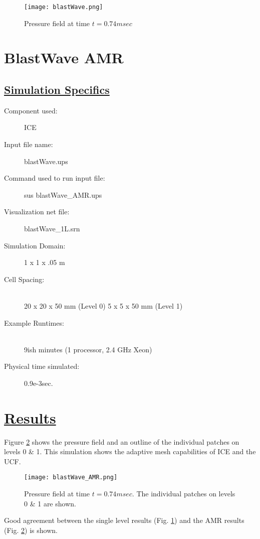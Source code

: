 \begin{figure}
  \texttt{[image: blastWave.png]}
  \caption{Pressure field at time $t = 0.74msec$}
  \label{results.BW}
  \end{figure}
\newpage


\section*{\center BlastWave AMR}
\subsection*{\underline{Simulation Specifics}}
\begin{description} 
\item [Component used:] \hfill ICE
\item [Input file name:] \hfill blastWave.ups
\item [Command used to run input file:]\hfill sus blastWave\_AMR.ups
\item [Visualization net file:]\hfill blastWave\_1L.srn\\


\item [Simulation Domain:]\hfill    1 x 1 x .05 m
\item [Cell Spacing:]\hfill \\ 
20 x 20 x 50 mm (Level 0) 
5 x 5 x 50 mm (Level 1)


\item [Example Runtimes:] \hfill \\
 9ish minutes   (1 processor, 2.4 GHz Xeon)

\item [Physical time simulated:] \hfill 0.9e-3sec.

\end{description}

\section*{\underline{Results}}
Figure \ref{results.BW.AMR} shows the pressure field and an outline of the
individual patches on levels 0 \& 1.  This simulation shows the adaptive
mesh capabilities of ICE and the UCF.
\begin{figure}
  \texttt{[image: blastWave\_AMR.png]}
  \caption{Pressure field at time $t = 0.74msec$.  The individual patches on levels 0 \& 1 are shown.}
  \label{results.BW.AMR}
  \end{figure}
Good agreement between the single level results (Fig. \ref{results.BW}) and the AMR results (Fig.
\ref{results.BW.AMR}) is shown.
\newpage

